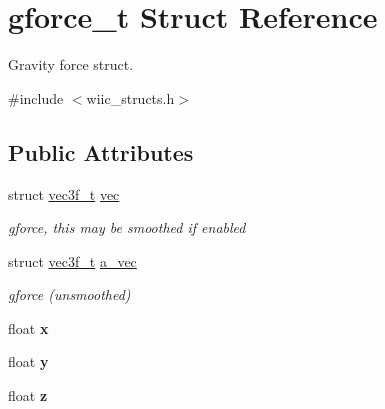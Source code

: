 \hypertarget{structgforce__t}{\section{gforce\-\_\-t Struct Reference}
\label{structgforce__t}
}


Gravity force struct.  




{\ttfamily \#include $<$wiic\-\_\-structs.\-h$>$}

\subsection*{Public Attributes}
\begin{DoxyCompactItemize}
\item 
\hypertarget{structgforce__t_a97f8ca8f50cd68fd5c5e9530758c461e}{struct \hyperlink{structvec3f__t}{vec3f\-\_\-t} \hyperlink{structgforce__t_a97f8ca8f50cd68fd5c5e9530758c461e}{vec}}\label{structgforce__t_a97f8ca8f50cd68fd5c5e9530758c461e}

\begin{DoxyCompactList}\small\item\em gforce, this may be smoothed if enabled \end{DoxyCompactList}\item 
\hypertarget{structgforce__t_a51f24cbec42c9cb0027c510eaa7c8f46}{struct \hyperlink{structvec3f__t}{vec3f\-\_\-t} \hyperlink{structgforce__t_a51f24cbec42c9cb0027c510eaa7c8f46}{a\-\_\-vec}}\label{structgforce__t_a51f24cbec42c9cb0027c510eaa7c8f46}

\begin{DoxyCompactList}\small\item\em gforce (unsmoothed) \end{DoxyCompactList}\item 
\hypertarget{structgforce__t_af70731383518dfcbf6d9a60c8122dda7}{float {\bfseries x}}\label{structgforce__t_af70731383518dfcbf6d9a60c8122dda7}

\item 
\hypertarget{structgforce__t_aad55a07a796dc28a6659ac67117bc97f}{float {\bfseries y}}\label{structgforce__t_aad55a07a796dc28a6659ac67117bc97f}

\item 
\hypertarget{structgforce__t_af73f5839c1d7921511c2aead836b2ec1}{float {\bfseries z}}\label{structgforce__t_af73f5839c1d7921511c2aead836b2ec1}

\end{DoxyCompactItemize}



